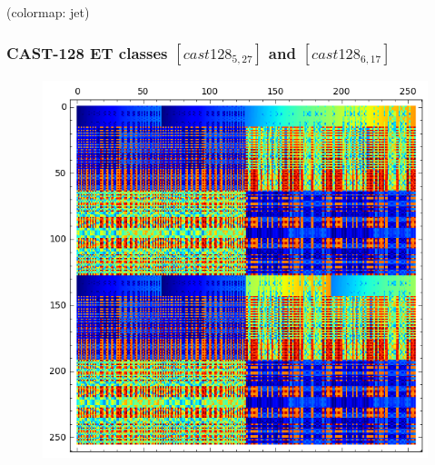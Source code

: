 \documentclass[pdf,sprung,slideColor,nocolorBG]{beamer}
\newenvironment{colortheme}[1]{
\def\ProvidesPackageRCS $##1${\relax}
\renewcommand{\ProcessOptions}{\relax}
\makeatletter

\makeatother
}{}
\newcommand{\slidecite}[1]{\tiny{(#1)}\normalsize{}}
\begin{document}
\begin{colortheme}{jubata}
\begin{frame}
\begin{figure}
\begin{minipage}{.48\textwidth}
  \label{fig:cast128_5_16_bent_cayley_graph_index_matrix}
\end{minipage}%
\end{figure}
\slidecite{colormap: jet}
\end{frame}

\begin{frame}
\frametitle{CAST-128 ET classes $[cast128_{5,27}]$ and $[cast128_{6,17}]$}
\begin{figure}
\centering
\begin{minipage}{.48\textwidth}
  \centering
\includegraphics[width=.9\linewidth]{../matrix_plot/cast128_5_27_bent_cayley_graph_index_matrix.png}
  \label{fig:cast128_5_27_bent_cayley_graph_index_matrix}
\end{minipage}%
\begin{minipage}{.48\textwidth}
  \centering

\end{minipage}
\end{figure}
\end{frame}
\end{colortheme}
\end{document}

